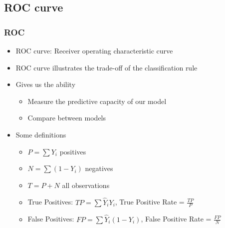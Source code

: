 \documentclass[
  shownotes,
  xcolor={svgnames},
  hyperref={colorlinks,citecolor=DarkBlue,linkcolor=DarkRed,urlcolor=DarkBlue}
  , aspectratio=169]{beamer}
\begin{document}
\subsection{ROC curve}
\begin{frame}[fragile]
\frametitle{ROC}


\begin{itemize}
\item ROC curve: Receiver operating characteristic curve
\medskip
\item ROC curve illustrates the trade-off of the classification rule
\medskip
\item Gives us the ability
\begin{itemize}
  \item Measure the predictive capacity of our model
  \medskip
  \item Compare between models
  \medskip
\end{itemize}
  \item Some definitions
  \begin{itemize}
    \item $P=\sum Y_i$ positives
    \medskip
    \item $N=\sum(1-Y_i)$ negatives
    \medskip
    \item $T=P+N$ all observations
    \medskip
    \item True Positives: $TP=\sum \hat{Y}_i Y_i$, True Positive Rate = $\frac{TP}{P}$
    \medskip
    \item False Positives: $FP=\sum \hat{Y}_i (1-Y_i)$, False Positive Rate = $\frac{FP}{N}$

  \end{itemize}
\end{itemize}


\end{frame}
\end{document}
